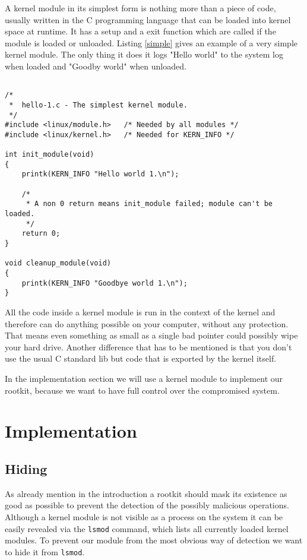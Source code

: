 \documentclass[12pt]{article}
\newcommand{\shellcmdinline}[1]{\texttt{\footnotesize #1}}
\begin{document}
A kernel module in its simplest form is nothing more than a piece of code, usually written in the C programming language that can be loaded into kernel space at runtime. It has a setup and a exit function which are called if the module is loaded or unloaded. Listing \ref{simple} gives an example of a very simple kernel module. The only thing it does it logs "Hello world" to the system log when loaded and "Goodby world" when unloaded.

\begin{lstlisting}[caption=Source: \url{http://www.tldp.org/LDP/lkmpg/2.6/html/x121.html}., label=simple]

/*  
 *  hello-1.c - The simplest kernel module.
 */
#include <linux/module.h>	/* Needed by all modules */
#include <linux/kernel.h>	/* Needed for KERN_INFO */

int init_module(void)
{
	printk(KERN_INFO "Hello world 1.\n");

	/* 
	 * A non 0 return means init_module failed; module can't be loaded. 
	 */
	return 0;
}

void cleanup_module(void)
{
	printk(KERN_INFO "Goodbye world 1.\n");
}

\end{lstlisting}

All the code inside a kernel module is run in the context of the kernel and therefore can do anything possible on your computer, without any protection. That means even something as small as a single bad pointer could possibly wipe your hard drive. Another difference that has to be mentioned is that you don't use the usual C standard lib but code that is exported by the kernel itself. 

In the implementation section we will use a kernel module to implement our rootkit, because we want to have full control over the compromised system.

\section{Implementation}
\label{sec:impl}

\subsection{Hiding}
As already mention in the introduction a rootkit should mask its existence as good as possible to prevent the detection of the possibly malicious operations. Although a kernel module is not visible as a process on the system it can be easily revealed via the \shellcmdinline{lsmod} command, which lists all currently loaded kernel modules. To prevent our module from the most obvious way of detection we want to hide it from \shellcmdinline{lsmod}. 
\end{document}
